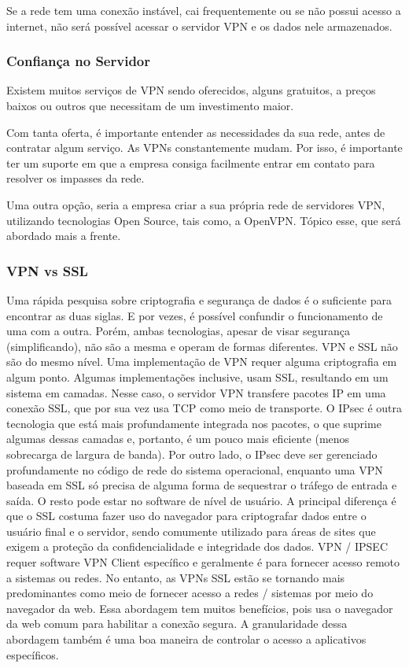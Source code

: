 \documentclass[12pt]{article}
\begin{document}
\begin{flushleft}
Se a rede tem uma conexão instável, cai frequentemente ou se não possui acesso a internet, não será possível acessar o servidor VPN e os dados nele armazenados.

\subsubsection{Confiança no Servidor}
Existem muitos serviços de VPN sendo oferecidos, alguns gratuitos, a preços baixos ou outros que necessitam de um investimento maior.

Com tanta oferta, é importante entender as necessidades da sua rede, antes de contratar algum serviço.  As VPNs constantemente mudam. Por isso, é importante ter um suporte em que a empresa consiga facilmente entrar em contato para resolver os impasses da rede.

Uma outra opção, seria a empresa criar a sua própria rede de servidores VPN, utilizando tecnologias Open Source, tais como, a OpenVPN. Tópico esse, que será abordado mais a frente.


\subsubsection{VPN vs SSL}

Uma rápida pesquisa sobre criptografia e segurança de dados é o suficiente para encontrar as duas siglas. E por vezes, é possível confundir o funcionamento de uma com a outra. Porém, ambas tecnologias, apesar de visar segurança (simplificando), não são a mesma e operam de formas diferentes.
VPN e SSL não são do mesmo nível. Uma implementação de VPN requer alguma criptografia em algum ponto. Algumas implementações inclusive, usam SSL, resultando em um sistema em camadas.
Nesse caso, o servidor  VPN transfere pacotes IP em uma conexão SSL, que por sua vez usa TCP como meio de transporte. O IPsec é outra tecnologia que está mais profundamente integrada nos pacotes, o que suprime algumas dessas camadas e, portanto, é um pouco mais eficiente (menos sobrecarga de largura de banda). 
Por outro lado, o IPsec deve ser gerenciado profundamente no código de rede do sistema operacional, enquanto uma VPN baseada em SSL só precisa de alguma forma de sequestrar o tráfego de entrada e saída. O resto pode estar no software de nível de usuário.
A principal diferença é que o SSL costuma fazer uso do navegador para criptografar dados entre o usuário final e o servidor, sendo comumente utilizado para áreas de sites que exigem a proteção da confidencialidade e integridade dos dados. VPN / IPSEC requer software VPN Client específico e geralmente é para fornecer acesso remoto a sistemas ou redes.
No entanto, as VPNs SSL estão se tornando mais predominantes como meio de fornecer acesso a redes / sistemas por meio do navegador da web. Essa abordagem tem muitos benefícios, pois usa o navegador da web comum para habilitar a conexão segura. A granularidade dessa abordagem também é uma boa maneira de controlar o acesso a aplicativos específicos.



\end{flushleft}
\end{document}
